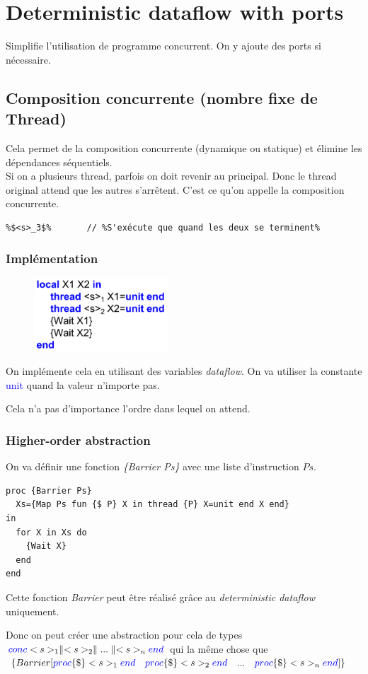 \documentclass{report}
\begin{document}
\section{Deterministic dataflow with ports}
Simplifie l'utilisation de programme concurrent. On y ajoute des ports si nécessaire.

\subsection{Composition concurrente (nombre fixe de Thread)}
Cela permet de la composition concurrente (dynamique ou statique) et élimine les dépendances séquentiels.\\
Si on a plusieurs thread, parfois on doit revenir au principal. Donc le thread original attend que les autres s'arrêtent. C'est ce qu'on appelle la composition concurrente.
\begin{lstlisting}[escapechar=\%]
%$(<s>_1 \parallel <s>_2)$%  	 // %Crée deux threads et attend que les deux se terminent%
%$<s>_3$%		// %S'exécute que quand les deux se terminent%
\end{lstlisting}

\subsubsection{Implémentation}
\begin{figure}
\centering
\includegraphics[width=5cm]{img/deterministicDataflowUnit.png}
\end{figure}
On implémente cela en utilisant des variables \textit{dataflow}. On va utiliser la constante \textcolor{blue}{unit} quand la valeur n'importe pas.\par 
Cela n'a pas d'importance l'ordre dans lequel on attend.

\subsubsection{Higher-order abstraction}
On va définir une fonction \textit{\{Barrier Ps\}} avec une liste d'instruction $Ps$.
\begin{lstlisting}[escapechar=\%]
proc {Barrier Ps} 
  Xs={Map Ps fun {$ P} X in thread {P} X=unit end X end}
in 
  for X in Xs do 
    {Wait X} 
  end
end
\end{lstlisting}
Cette fonction \textit{Barrier} peut être réalisé grâce au \textit{deterministic dataflow} uniquement.\par 
Donc on peut créer une abstraction pour cela de types $\textcolor{blue}{conc} <s>_1 \parallel <s>_2 \parallel ... \parallel <s>_n \textcolor{blue}{end}$ qui la même chose que $\{Barrier [\textcolor{blue}{proc} \{\$\} <s>_1 \textcolor{blue}{end} \quad \textcolor{blue}{proc} \{\$\} <s>_2 \textcolor{blue}{end} \quad ... \quad \textcolor{blue}{proc} \{\$\} <s>_n \textcolor{blue}{end} ]\}$
\end{document}
